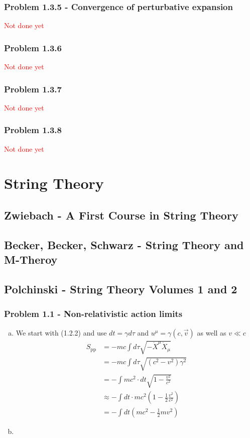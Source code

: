 \documentclass[10pt,a4paper]{article}
\theoremstyle{definition}
\begin{document}
\subsubsection{Problem 1.3.5 - Convergence of perturbative expansion}
\textcolor{red}{Not done yet}

\subsubsection{Problem 1.3.6}
\textcolor{red}{Not done yet}

\subsubsection{Problem 1.3.7}
\textcolor{red}{Not done yet}

\subsubsection{Problem 1.3.8}
\textcolor{red}{Not done yet}



\section{String Theory}
\subsection{{\sc Zwiebach} - A First Course in String Theory }

\subsection{{\sc Becker, Becker, Schwarz} - String Theory and M-Theroy }

\subsection{{\sc Polchinski} - String Theory Volumes 1 and 2 }
\subsubsection{Problem 1.1 - Non-relativistic action limits}
\begin{enumerate}[(a)]
    \item We start with (1.2.2) and use $dt=\gamma d\tau$ and $u^\mu=\gamma(c,\vec{v})$ as well as $v\ll c$
    \begin{align}
        S_\text{pp}&=-mc\int d\tau\sqrt{-\dot X^\mu\dot X_\mu}\\
        &=-mc\int d\tau\sqrt{(c^2-v^2)\gamma^2}\\
        &=-\int mc^2\cdot dt\sqrt{1-\frac{v^2}{c^2}}\\
        &\approx-\int dt\cdot mc^2\left(1-\frac{1}{2}\frac{v^2}{c^2}\right)\\
        &=-\int dt\left(mc^2-\frac{1}{2}mv^2\right)
    \end{align}
    
    \item
    
\end{enumerate}
\end{document}
